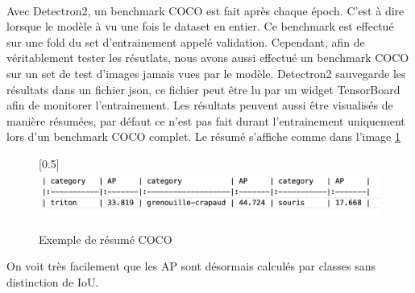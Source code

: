 \paragraph{}
Avec Detectron2, un benchmark COCO est fait après chaque époch. C'est à dire lorsque le modèle à vu une fois le dataset en entier. Ce benchmark est effectué sur une fold du set d'entrainement appelé validation. Cependant, afin de véritablement tester les résutlats, nous avons aussi effectué un benchmark COCO sur un set de test d'images jamais vues par le modèle. 
Detectron2 sauvegarde les résultats dans un fichier json, ce fichier peut être lu par un widget TensorBoard afin de monitorer l'entrainement.
Les résultats peuvent aussi être visualisés de manière résumées, par défaut ce n'est pas fait durant l'entrainement uniquement lors d'un benchmark COCO complet. Le résumé s'affiche comme dans l'image \ref{fig:eval_coco_benchmark_resume} 
\begin{figure}
    \centering
    \scalebox{0.5}[0.5]{\includegraphics[width=\textwidth]{images/eval_coco_benchmark_resume.png}}
    \caption{Exemple de résumé COCO}
    \label{fig:eval_coco_benchmark_resume}
\end{figure}
On voit très facilement que les AP sont désormais calculés par classes sans distinction de IoU. 


